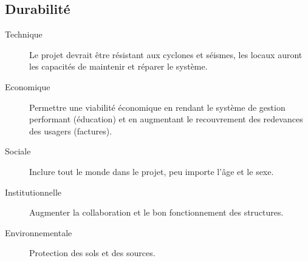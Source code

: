 \documentclass[a4paper, 11pt]{article}
\begin{document}
\subsection*{Durabilité}
\begin{description}
  \item[Technique] Le projet devrait être résistant aux cyclones et séismes, les locaux auront les capacités de maintenir et réparer le système.
  \item[Economique] Permettre une viabilité économique en rendant le système de gestion performant (éducation) et en augmentant le recouvrement des redevances des usagers (factures).
  \item[Sociale] Inclure tout le monde dans le projet, peu importe l'âge et le sexe.
  \item[Institutionnelle] Augmenter la collaboration et le bon fonctionnement des structures.
  \item[Environnementale] Protection des sols et des sources.
\end{description}
\end{document}
